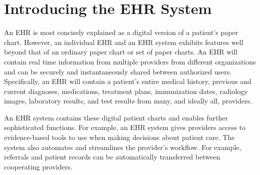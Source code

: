 \documentclass[10pt]{article}
\begin{document}



 

\section{Introducing the EHR System}
\label{sec:Intro_EHR}

An EHR is most concisely explained as a digital version of a patient's paper chart.
However, an individual EHR and an EHR system exhibits features well beyond that of an ordinary paper chart or set of paper charts.
An EHR will contain real time information from multiple providers from different organizations and can be securely and instantaneously shared between authorized users.
Specifically, an EHR will contain a patient's entire medical history, previous and current diagnoses, medications, treatment plans, immunization dates, radiology images, laboratory results, and test results from many, and ideally all, providers.

An EHR system contains these digital patient charts and enables further sophisticated functions.
For example, an EHR system gives providers access to evidence-based tools to use when making decisions about patient care.
The system also automates and streamlines the provider's workflow. For example, referrals and patient records can be automatically transferred between cooperating providers.
\cite{healthit-ehr}
\end{document}
